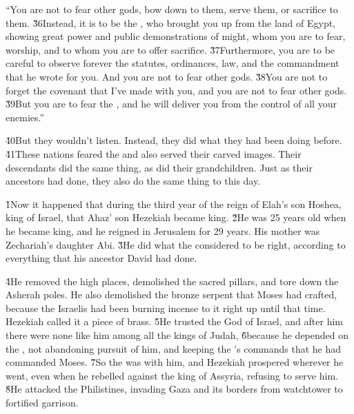 \begin{poetry}
\poeml ``You are not to fear other gods, bow down to them, serve them, or sacrifice to them. \v{36}Instead, it is to be the , who brought you up from the land of Egypt, showing great power and public demonstrations of might, whom you are to fear, worship, and to whom you are to offer sacrifice. \v{37}Furthermore, you are to be careful to observe forever the statutes, ordinances, law, and the commandment that he wrote for you. And you are not to fear other gods. \v{38}You are not to forget the covenant that I've made with you, and you are not to fear other gods. \v{39}But you are to fear the , and he will deliver you from the control of all your enemies.''
\end{poetry}

\v{40}But they wouldn't listen. Instead, they did what they had been doing before. \v{41}These nations feared the  and also served their carved images. Their descendants did the same thing, as did their grandchildren. Just as their ancestors had done, they also do the same thing to this day.

\v{1}Now it happened that during the third year of the reign of Elah's son Hoshea, king of Israel, that Ahaz' son Hezekiah became king. \v{2}He was 25 years old when he became king, and he reigned in Jerusalem for 29 years. His mother was Zechariah's daughter Abi. \v{3}He did what the  considered to be right, according to everything that his ancestor David had done.

\v{4}He removed the high places, demolished the sacred pillars, and tore down the Asherah poles. He also demolished the bronze serpent that Moses had crafted, because the Israelis had been burning incense to it right up until that time. Hezekiah called it a piece of brass. \v{5}He trusted the  God of Israel, and after him there were none like him among all the kings of Judah, \v{6}because he depended on the , not abandoning pursuit of him, and keeping the 's commands that he had commanded Moses. \v{7}So the  was with him, and Hezekiah prospered wherever he went, even when he rebelled against the king of Assyria, refusing to serve him. \v{8}He attacked the Philistines, invading Gaza and its borders from watchtower to fortified garrison.

